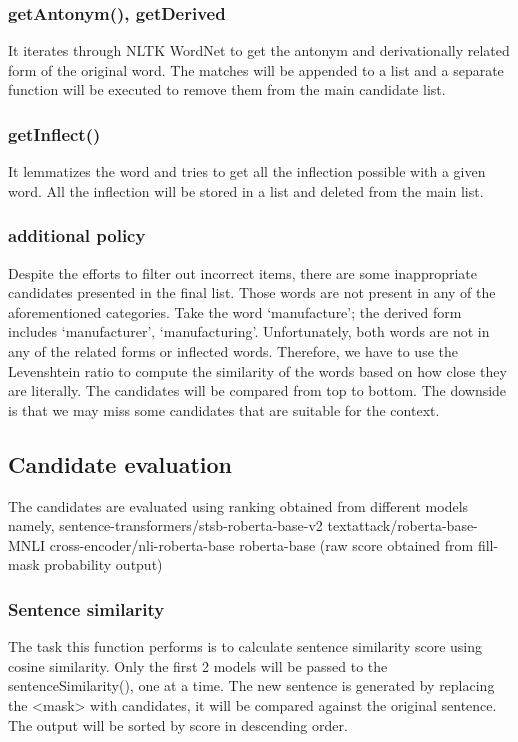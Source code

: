 \documentclass[12pt,oneside,openright,a4paper]{cpe-english-project}
\begin{document}
\subsubsection{getAntonym(), getDerived}
It iterates through NLTK WordNet to get the antonym and derivationally related form of the original word. The matches will be appended to a list and a separate function will be executed to remove them from the main candidate list.

\subsubsection{getInflect()}
It lemmatizes the word and tries to get all the inflection possible with a given word. All the inflection will be stored in a list and deleted from the main list.

\subsubsection{additional policy}
Despite the efforts to filter out incorrect items, there are some inappropriate candidates presented in the final list. Those words are not present in any of the aforementioned categories. Take the word ‘manufacture’; the derived form includes ‘manufacturer’, ‘manufacturing’. Unfortunately, both words are not in any of the related forms or inflected words. Therefore, we have to use the Levenshtein ratio to compute the similarity of the words based on how close they are literally. The candidates will be compared from top to bottom. The downside is that we may miss some candidates that are suitable for the context.

\subsection{Candidate evaluation}

The candidates are evaluated using ranking obtained from different models namely, 
sentence-transformers/stsb-roberta-base-v2 
textattack/roberta-base-MNLI
cross-encoder/nli-roberta-base
roberta-base (raw score obtained from fill-mask probability output)





\subsubsection{Sentence similarity }
The task this function performs is to calculate sentence similarity score using cosine similarity. Only the first 2 models will be passed to the sentenceSimilarity(), one at a time. The new sentence is generated by replacing the <mask> with candidates, it will be compared against the original sentence. The output will be sorted by score in descending order.
\end{document}
